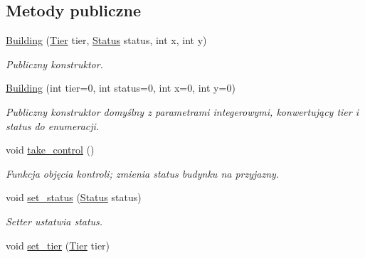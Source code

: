 \subsection*{Metody publiczne}
\begin{DoxyCompactItemize}
\item 
\hyperlink{classmodel_1_1Building_a17a7270e4283374db400aff509e59f27}{Building} (\hyperlink{tier_8hpp_a50a003ab1ea342f138c038fabfd1ee55}{Tier} tier, \hyperlink{status_8hpp_a822822ece62ee330ee656034849df887}{Status} status, int x, int y)
\begin{DoxyCompactList}\small\item\em Publiczny konstruktor. \end{DoxyCompactList}\item 
\hyperlink{classmodel_1_1Building_af8f2ee9d61a38ca85c6d035b8a1090e7}{Building} (int tier=0, int status=0, int x=0, int y=0)
\begin{DoxyCompactList}\small\item\em Publiczny konstruktor domyślny z parametrami integerowymi, konwertujący tier i status do enumeracji. \end{DoxyCompactList}\item 
\mbox{\label{classmodel_1_1Building_a1926969cec3c46b9a38bf8a0c425dbc7}} 
void \hyperlink{classmodel_1_1Building_a1926969cec3c46b9a38bf8a0c425dbc7}{take\+\_\+control} ()
\begin{DoxyCompactList}\small\item\em Funkcja objęcia kontroli; zmienia status budynku na przyjazny. \end{DoxyCompactList}\item 
\mbox{\label{classmodel_1_1Building_a41dc923964b54592825864183d181964}} 
void \hyperlink{classmodel_1_1Building_a41dc923964b54592825864183d181964}{set\+\_\+status} (\hyperlink{status_8hpp_a822822ece62ee330ee656034849df887}{Status} status)
\begin{DoxyCompactList}\small\item\em Setter ustatwia status. \end{DoxyCompactList}\item 
\mbox{\label{classmodel_1_1Building_a1fec2540ae9c9acf26734fcc2d8902d8}} 
void \hyperlink{classmodel_1_1Building_a1fec2540ae9c9acf26734fcc2d8902d8}{set\+\_\+tier} (\hyperlink{tier_8hpp_a50a003ab1ea342f138c038fabfd1ee55}{Tier} tier)

\end{DoxyCompactItemize}
